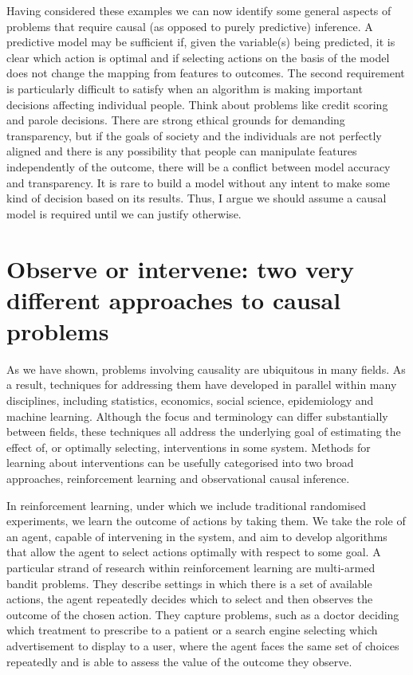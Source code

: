 \documentclass[11pt,a4paper,twoside]{report}
\theoremstyle{plain}
\theoremstyle{definition}
\begin{document}
Having considered these examples we can now identify some general aspects of problems that require causal (as opposed to purely predictive) inference. A predictive model may be sufficient if, given the variable(s) being predicted, it is clear which action is optimal and if selecting actions on the basis of the model does not change the mapping from features to outcomes. The second requirement is particularly difficult to satisfy when an algorithm is making important decisions affecting individual people. Think about problems like credit scoring and parole decisions. There are strong ethical grounds for demanding transparency, but if the goals of society and the individuals are not perfectly aligned and there is any possibility that people can manipulate features independently of the outcome, there will be a conflict between model accuracy and transparency. It is rare to build a model without any intent to make some kind of decision based on its results. Thus, I argue we should assume a causal model is required until we can justify otherwise.  

\section{Observe or intervene: two very different approaches to causal problems}

As we have shown, problems involving causality are ubiquitous in many fields. As a result, techniques for addressing them have developed in parallel within many disciplines, including statistics, economics, social science, epidemiology and machine learning. Although the focus and terminology can differ substantially between fields, these techniques all address the underlying goal of estimating the effect of, or optimally selecting, interventions in some system. Methods for learning about interventions can be usefully categorised into two broad approaches, reinforcement learning and observational causal inference. 

In reinforcement learning, under which we include traditional randomised experiments, we learn the outcome of actions by taking them. We take the role of an agent, capable of intervening in the system, and aim to develop algorithms that allow the agent to select actions optimally with respect to some goal. A particular strand of research within reinforcement learning are multi-armed bandit problems. They describe settings in which there is a set of available actions, the agent repeatedly decides which to select and then observes the outcome of the chosen action. They capture problems, such as a doctor deciding which treatment to prescribe to a patient or a search engine selecting which advertisement to display to a user, where the agent faces the same set of choices repeatedly and is able to assess the value of the outcome they observe. 
\end{document}
